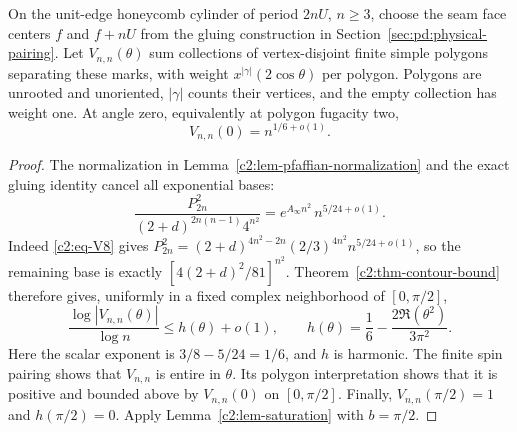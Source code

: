 \begin{proposition}
\label{c2:prop-cylinder-exponent}
On the unit-edge honeycomb cylinder of period \(2nU\), \(n\ge3\),
choose the seam face centers \(f\) and \(f+nU\) from the gluing
construction in Section~\ref{sec:pd:physical-pairing}.
Let \(V_{n,n}(\theta)\) sum collections of vertex-disjoint finite simple
polygons separating these marks, with weight
\(x^{|\gamma|}(2\cos\theta)\) per polygon. Polygons are unrooted and
unoriented, \(|\gamma|\) counts their vertices, and the empty
collection has weight one. At angle zero,
equivalently at polygon fugacity two,
\[
 V_{n,n}(0)=n^{1/6+o(1)}.
\]
\end{proposition}

\begin{proof}
The normalization in Lemma~\ref{c2:lem-pfaffian-normalization} and the
exact gluing identity cancel all exponential bases:
\[
 \frac{P_{2n}^2}{(2+d)^{2n(n-1)}4^{n^2}}
 =e^{A_\infty n^2}\,n^{5/24+o(1)}.
\]
Indeed \eqref{c2:eq-V8} gives
\(P_{2n}^2=(2+d)^{4n^2-2n}(2/3)^{4n^2}n^{5/24+o(1)}\),
so the remaining base is exactly \([4(2+d)^2/81]^{n^2}\). Theorem~\ref{c2:thm-contour-bound} therefore gives,
uniformly in a fixed complex neighborhood of \([0,\pi/2]\),
\[
 \frac{\log|V_{n,n}(\theta)|}{\log n}
 \le h(\theta)+o(1),\qquad
 h(\theta)=\frac16-\frac{2\Re(\theta^2)}{3\pi^2}.
\]
Here the scalar exponent is \(3/8-5/24=1/6\), and \(h\) is harmonic. The finite spin pairing shows that
\(V_{n,n}\) is entire in \(\theta\). Its polygon interpretation shows
that it is positive and bounded above by \(V_{n,n}(0)\) on
\([0,\pi/2]\). Finally,
\(V_{n,n}(\pi/2)=1\) and \(h(\pi/2)=0\). Apply
Lemma~\ref{c2:lem-saturation} with \(b=\pi/2\).
\end{proof}
